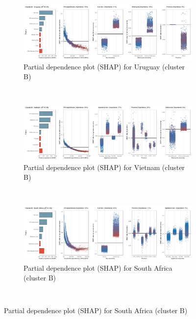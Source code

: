 \begin{figure}[ht!]\ContinuedFloat
    \centering
   \begin{subfigure}[b]{\textwidth}
   \centering
         \caption{Partial dependence plot (SHAP) for Uruguay (cluster B)}
         \label{fig:5b_URY}
         \includegraphics[width=\textwidth]{Figure 5b/Figure_5b_URY}
         \end{subfigure}
    \\
    \vspace{0.5cm}
    \begin{subfigure}[b]{\textwidth}
    \centering
         \caption{Partial dependence plot (SHAP) for Vietnam (cluster B)}
         \label{fig:5b_VNM}
         \includegraphics[width=\textwidth]{Figure 5b/Figure_5b_VNM}    
         \end{subfigure}
    \\
    \vspace{0.5cm}
   \begin{subfigure}[b]{\textwidth}
   \centering
         \caption{Partial dependence plot (SHAP) for South Africa (cluster B)}
         \label{fig:5b_ZAF}
         \includegraphics[width=\textwidth]{Figure 5b/Figure_5b_ZAF}   
         \end{subfigure}
    \\
    \vspace{0.5cm}
   

\end{figure}
